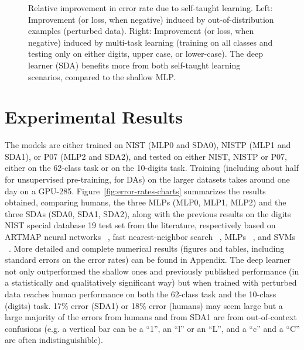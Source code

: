 \documentclass{article} %
\begin{document}
\begin{figure}[ht]
\centerline{}
\caption{Relative improvement in error rate due to self-taught learning. 
Left: Improvement (or loss, when negative)
induced by out-of-distribution examples (perturbed data). 
Right: Improvement (or loss, when negative) induced by multi-task 
learning (training on all classes and testing only on either digits,
upper case, or lower-case). The deep learner (SDA) benefits more from
both self-taught learning scenarios, compared to the shallow MLP.}
\label{fig:improvements-charts}
\end{figure}

\section{Experimental Results}

The models are either trained on NIST (MLP0 and SDA0), 
NISTP (MLP1 and SDA1), or P07 (MLP2 and SDA2), and tested
on either NIST, NISTP or P07, either on the 62-class task
or on the 10-digits task. Training (including about half
for unsupervised pre-training, for DAs) on the larger
datasets takes around one day on a GPU-285.
Figure~\ref{fig:error-rates-charts} summarizes the results obtained,
comparing humans, the three MLPs (MLP0, MLP1, MLP2) and the three SDAs (SDA0, SDA1,
SDA2), along with the previous results on the digits NIST special database
19 test set from the literature, respectively based on ARTMAP neural
networks ~\citep{Granger+al-2007}, fast nearest-neighbor search
~\citep{Cortes+al-2000}, MLPs ~\citep{Oliveira+al-2002-short}, and SVMs
~\citep{Milgram+al-2005}.  More detailed and complete numerical results
(figures and tables, including standard errors on the error rates) can be
found in Appendix.
The deep learner not only outperformed the shallow ones and
previously published performance (in a statistically and qualitatively
significant way) but when trained with perturbed data
reaches human performance on both the 62-class task
and the 10-class (digits) task. 
17\% error (SDA1) or 18\% error (humans) may seem large but a large
majority of the errors from humans and from SDA1 are from out-of-context
confusions (e.g. a vertical bar can be a ``1'', an ``l'' or an ``L'', and a
``c'' and a ``C'' are often indistinguishible).
\end{document}
